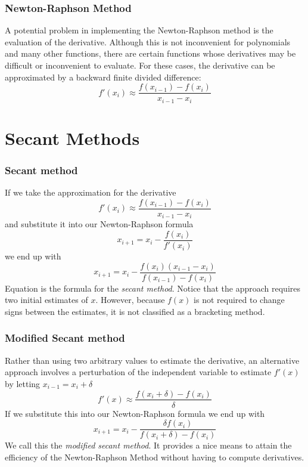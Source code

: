 \documentclass{if-beamer}
\begin{document}
\begin{frame}
\frametitle{Newton-Raphson Method}
A potential problem in implementing the Newton-Raphson method is
the evaluation of the derivative. Although this is not inconvenient for polynomials and many other functions, there are certain functions whose derivatives may be difficult or inconvenient to evaluate. For these cases, the derivative can be approximated by a backward finite divided difference:
$$ f'(x_i) \approx \frac{f(x_{i-1})-f(x_i)}{x_{i-1}-x_i}$$
\end{frame}

\section{Secant Methods}

\begin{frame}
\frametitle{Secant method}
If we take the approximation for the derivative
$$ f'(x_i) \approx \frac{f(x_{i-1})-f(x_i)}{x_{i-1}-x_i}$$
and substitute it into our Newton-Raphson formula
$$x_{i+1} = x_i - \frac{f(x_i)}{f'(x_i)}$$
we end up with 
$$x_{i+1} = x_i - \frac{f(x_i)\left(x_{i-1}-x_i\right)}{f(x_{i-1})-f(x_i)} $$
Equation is the formula for the \textit{secant method}. Notice that the approach requires two initial estimates of $x$. However, because $f(x)$ is not required to change signs between the estimates, it is not classified as a bracketing method.
\end{frame}

\begin{frame}	
\frametitle{Modified Secant method}
Rather than using two arbitrary values to estimate the derivative, an alternative approach involves a perturbation of the independent variable to estimate $f'(x)$ by letting $x_{i-1} = x_i + \delta$
$$f'(x) \approx \frac{f(x_i + \delta)-f(x_i)}{\delta}$$
If we substitute this into our Newton-Raphson formula we end up with
$$x_{i+1} = x_i - \frac{\delta f(x_i)}{f(x_{i}+\delta)-f(x_i)} $$	
We call this the \textit{modified secant method}. It provides a nice means to attain the efficiency of the Newton-Raphson Method without having to compute derivatives.
\end{frame}
\end{document}

